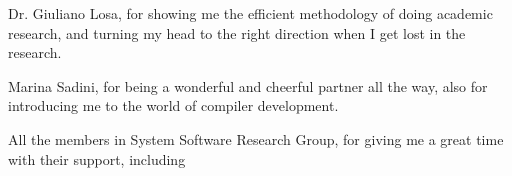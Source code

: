 \documentclass[12pt]{report}
\begin{document}
Dr. Giuliano Losa, for showing me the efficient methodology of doing academic research, and turning my head to the right direction when I get lost in the research.

Marina Sadini, for being a wonderful and cheerful partner all the way, also for introducing me to the world of compiler development.

All the members in System Software Research Group, for giving me a great time with their support, including

\tableofcontents
\pagebreak

\listoffigures
\pagebreak

\listoftables
\pagebreak

\pagestyle{myheadings}

\newcommand{\detstart}{\_\_det\_start}
\newcommand{\detend}{\_\_det\_end}
\newcommand{\dettick}{\_\_det\_tick}












%

\end{document}
